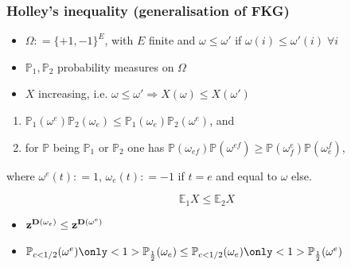 \documentclass{beamer}
\numberwithin{equation}{section}
\newcommand{\deq}{\mathrel{\mathop:}=}
\newcommand{\E}{{\mathbb E }}
\renewcommand{\P}{{\mathbb P}}
\newcommand{\Cr}{\color{red}}
\newcommand{\bemph}[1]{\textbf{\Cr{#1}}}
\begin{document}
\begin{frame}
\frametitle{Holley's inequality (generalisation of FKG)}
\bemph{Setting} 
\begin{itemize}
	\item $\Omega\deq \{+1,-1\}^E$, with $E$ finite and $\omega\leq\omega'$ if $\omega(i)\leq\omega'(i)\;\forall i$
	\item $\P_1,\P_2$ probability measures on $\Omega$
	\item $X$ increasing, i.e. $\omega\leq \omega'\Rightarrow X(\omega)\leq X(\omega')$
\end{itemize}
\bemph{If}
\begin{enumerate}
	\item $\P_1(\omega^e)\P_2(\omega_e)\leq \P_1(\omega_e)\P_2(\omega^e)$, and
	\item for $\P$ being $\P_1$ or $\P_2$ one has $\P(\omega_{ef})\P(\omega^{ef})\geq \P(\omega^e_f)\P(\omega_e^f)$,
\end{enumerate}
where $\omega^e(t)\deq 1$, $\omega_e(t)\deq -1$ if $t=e$ and equal to $\omega$ else.

\bemph{Then}
$$\E_1 X\leq \E_2 X$$

\bemph{What we have to prove}
\begin{itemize}
	\item ${\bf z}^{{\bf D}(\omega_e)}\leq {\bf z}^{{\bf D}(\omega^e)}$
	\item $\P_{c<1/2}(\omega^e)\only<1>{\P_{\frac{1}{2}}(\omega_e)}\leq \P_{c<1/2}(\omega_e)\only<1>{\P_{\frac{1}{2}}(\omega^e)}$\only<2>{~}
\end{itemize}
\end{frame}
\end{document}
